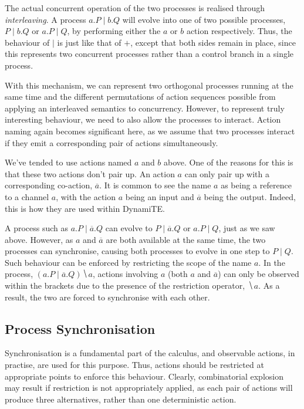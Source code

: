 \documentclass{acm_proc_article-sp}
\begin{document}
The actual concurrent operation of the two processes is realised through
\emph{interleaving}.  A process $a.P \mid b.Q$ will evolve into one of
two possible processes, $P \mid b.Q$ or $a.P \mid Q$, by performing
either the $a$ or $b$ action respectively.  Thus, the behaviour of
$\mid$ is just like that of $+$, except that both sides remain in place,
since this represents two concurrent processes rather than a control
branch in a single process.

With this mechanism, we can represent two orthogonal processes running
at the same time and the different permutations of action sequences
possible from applying an interleaved semantics to concurrency.
However, to represent truly interesting behaviour, we need to also
allow the processes to interact.  Action naming again becomes
significant here, as we assume that two processes interact if they emit
a corresponding pair of actions simultaneously.

We've tended to use actions named $a$ and $b$ above.  One of the reasons
for this is that these two actions don't pair up.  An action $a$ can
only pair up with a corresponding co-action, $\overline{a}$.  It is
common to see the name $a$ as being a reference to a channel $a$, with
the action $a$ being an input and $\overline{a}$ being the output.
Indeed, this is how they are used within DynamiTE.

A process such as $a.P \mid \overline{a}.Q$ can evolve to $P \mid
\overline{a}.Q$ or $a.P \mid Q$, just as we saw above.  However, as $a$
and $\overline{a}$ are both available at the same time, the two
processes can synchronise, causing both processes to evolve in one
step to $P \mid Q$.  Such behaviour can be enforced by restricting the
scope of the name $a$.  In the process, $(a.P \mid \overline{a}.Q)
\hide{a}$, actions involving $a$ (both $a$ and $\overline{a}$) can only
be observed within the brackets due to the presence of the restriction
operator, $\hide{a}$.  As a result, the two are forced to synchronise
with each other.

\subsection{Process Synchronisation}
\label{sync}

Synchronisation is a fundamental part of the calculus, and observable
actions, in practise, are used for this purpose.  Thus, actions should
be restricted at appropriate points to enforce this behaviour.  Clearly,
combinatorial explosion may result if restriction is not appropriately
applied, as each pair of actions will produce three alternatives, rather
than one deterministic action.  
\end{document}
